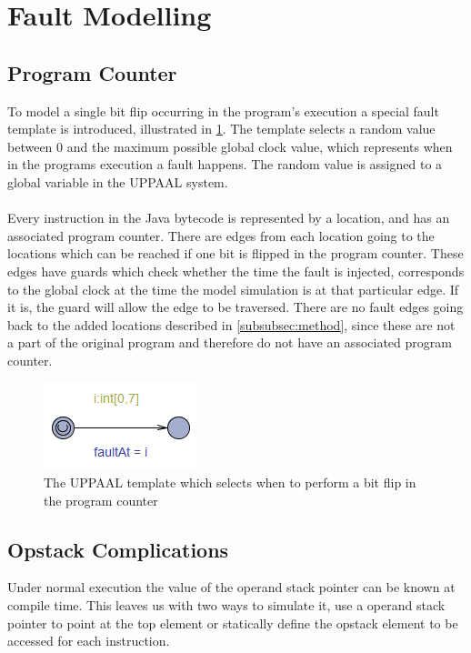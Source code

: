 \section{Fault Modelling}
\subsection{Program Counter}
To model a single bit flip occurring in the program's execution a special fault template is introduced, illustrated in \cref{fig:faultTime}. The template selects a random value between $0$ and the maximum possible global clock value, which represents when in the programs execution a fault happens. The random value is assigned to a global variable in the UPPAAL system.\\\\
Every instruction in the Java bytecode is represented by a location, and has an associated program counter. There are edges from each location going to the locations which can be reached if one bit is flipped in the program counter. These edges have guards which check whether the time the fault is injected, corresponds to the global clock at the time the model simulation is at that particular edge. If it is, the guard will allow the edge to be traversed. There are no fault edges going back to the added locations described in \cref{subsubsec:method}, since these are not a part of the original program and therefore do not have an associated program counter.
\begin{figure}[H]
\centering
\includegraphics{figures/fault.PNG}
\caption{The UPPAAL template which selects when to perform a bit flip in the program counter}
\label{fig:faultTime}
\end{figure}


\subsection{Opstack Complications}
Under normal execution the value of the operand stack pointer can be known at compile  time. This leaves us with two ways to simulate it, use a operand stack pointer to point at the top element or statically define the opstack element to be accessed for each instruction.

